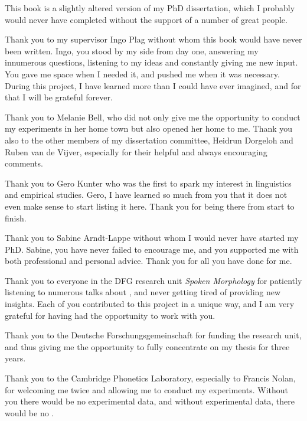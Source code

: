 \addchap{\lsAcknowledgementTitle} 

\vspace*{-0.4cm}
This book is a slightly altered version of my PhD dissertation, which I probably would never have completed without the support of a number of great people.

Thank you to my supervisor Ingo Plag without whom this book would have never been written. Ingo, you stood by my side from day one, answering my innumerous questions,  listening to my ideas and constantly giving me new input. You gave me space when I needed it, and pushed me when it was necessary. During this project, I have learned more than I could have ever imagined, and for that I will be grateful forever.

Thank you to Melanie Bell, who did not only give me the opportunity to conduct my experiments in her home town but also opened her home to me. 
Thank you also to the other members of my dissertation committee, Heidrun Dorgeloh and Ruben van de Vijver, especially for their helpful and always encouraging comments. 

Thank you to Gero Kunter who was the first to spark my interest in linguistics and empirical studies. Gero, I have learned so much from you that it does not even make sense to start listing it here. Thank you for being there from start to finish.

Thank you to Sabine Arndt-Lappe without whom I would never have started my PhD. Sabine, you have never failed to encourage me, and you supported me with both professional and personal advice. Thank you for all you have done for me.

Thank you to everyone in the DFG research unit \textit{Spoken Morphology} for patiently listening to numerous talks about , and never getting tired of providing new insights. Each of you contributed to this project in a unique way, and I am very grateful for having had the opportunity to work with you.

Thank you to the Deutsche Forschungsgemeinschaft for funding the research unit, and thus giving me the opportunity to fully concentrate on my thesis for three years.

Thank you to the Cambridge Phonetics Laboratory, especially to Francis Nolan, for welcoming me twice and allowing me to conduct my experiments. Without you there would be no experimental data, and without experimental data, there would be no .


